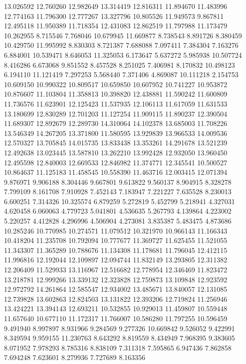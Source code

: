13.026592
12.760260
12.982649
13.314419
12.816311
11.894670
11.483996
12.774163
11.796300
12.777267
13.327796
10.805526
11.949573
9.867811
12.495118
11.950389
11.718354
12.431083
12.862519
11.797988
11.173479
10.262955
8.715546
7.768046
10.679945
11.669877
8.738543
8.891726
8.380459
10.429750
11.995992
8.830303
8.721387
7.688088
7.097411
7.384304
7.163276
6.884001
10.539471
8.646053
11.325053
6.173647
5.637272
5.985938
10.507724
8.416286
6.673068
9.851552
8.457528
8.251025
7.406981
8.170832
10.498123
6.194110
11.121419
7.297253
5.568440
7.371406
4.869087
10.111218
2.154753
10.609150
10.990322
10.809517
10.659850
10.607952
10.741227
10.953872
10.876607
11.103804
11.358813
10.398820
12.438881
11.590242
11.600809
11.736576
11.623901
12.125423
11.537935
12.106113
11.617059
11.631533
13.180699
12.830289
12.701203
11.127254
11.909115
11.890237
12.390504
11.689307
12.892679
12.289730
14.310064
14.102378
13.685003
11.708226
13.546349
14.267205
13.371800
11.580595
13.929839
13.966533
14.009536
12.570327
13.705845
14.015735
13.833438
13.353261
14.291678
13.521239
12.492638
13.023445
13.587810
13.262210
13.992428
12.932050
13.960450
12.495598
12.840003
12.669533
12.846982
11.374771
12.345541
10.500527
10.864637
11.125183
11.458545
10.558390
11.463716
12.003415
12.071394
9.876971
9.906188
8.304446
9.667801
9.613822
9.560137
8.904915
8.328278
7.799109
8.161708
7.910928
7.452143
7.183947
7.221227
7.635528
8.230013
6.600251
7.314326
10.325574
6.879259
5.272819
5.452799
5.218941
4.327031
4.620458
6.060063
4.779723
5.041801
4.536635
5.267793
4.139864
4.223002
5.220257
4.412828
4.296996
4.506904
4.273081
3.835387
5.483475
4.873686
10.285246
10.770985
10.274571
11.079512
10.321970
10.966143
11.166343
10.418204
11.235708
10.792094
10.777677
11.369727
11.625455
11.521055
11.343307
11.365289
10.788676
11.134308
11.178681
11.796045
12.412115
11.996816
12.192044
12.109897
12.094744
11.832149
13.293805
12.311382
12.206409
11.529933
13.116967
12.516682
12.778954
12.346469
11.823472
13.218781
12.999266
13.339132
12.323828
12.759873
13.109848
12.923592
12.972792
14.261864
12.585547
12.934002
13.485671
13.840057
12.131085
12.739828
13.602863
12.824503
13.131822
12.393206
12.719824
11.256946
13.424221
13.394143
12.693211
10.532855
10.929013
11.459807
10.559448
11.657640
10.677110
11.172317
11.766007
10.586280
11.797255
10.596459
9.491940
8.997897
8.931966
9.284569
9.277326
10.669842
9.526052
9.422991
8.349594
9.959155
11.230763
8.643292
8.819559
8.434949
7.968395
9.383605
8.071952
7.978293
8.785316
8.838109
7.311318
7.595865
6.947436
7.862858
7.694248
7.623601
8.279936
7.727689
8.163356
